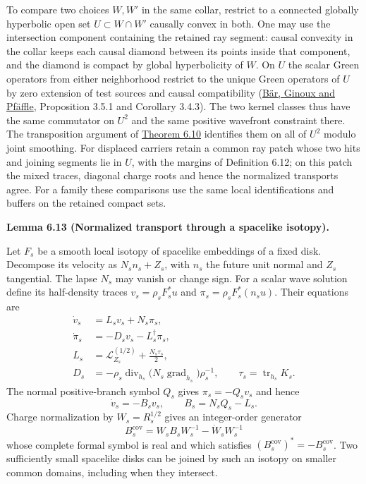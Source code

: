 \documentclass[
  english,
  11pt,
  reqno]{amsart}
\makeatletter
\newcommand{\pandocstatementheading}[1]{%
  \par\if@nobreak\else
    \addpenalty{\@beginparpenalty}%
    \addvspace{.5\baselineskip plus .2\baselineskip minus .2\baselineskip}%
  \fi
  {\normalfont\bfseries #1\par}%
  \nobreak\@afterindenttrue\@afterheading
}
\makeatother
\begin{document}
To compare two choices \(W,W'\) in the same collar, restrict to a
connected globally hyperbolic open set \(U\subset W\cap W'\) causally
convex in both. One may use the intersection component containing the
retained ray segment: causal convexity in the collar keeps each causal
diamond between its points inside that component, and the diamond is
compact by global hyperbolicity of \(W\). On \(U\) the scalar Green
operators from either neighborhood restrict to the unique Green
operators of \(U\) by zero extension of test sources and causal
compatibility (\hyperref[ref-BarGinouxPfaffle2007]{Bär, Ginoux and
Pfäffle}, Proposition 3.5.1 and Corollary 3.4.3). The two kernel classes
thus have the same commutator on \(U^2\) and the same positive wavefront
constraint there. The transposition argument of
\hyperref[thm:online-canonical-wave-kernel]{Theorem 6.10} identifies
them on all of \(U^2\) modulo joint smoothing. For displaced carriers
retain a common ray patch whose two hits and joining segments lie in
\(U\), with the margins of Definition 6.12; on this patch the mixed
traces, diagonal charge roots and hence the normalized transports agree.
For a family these comparisons use the same local identifications and
buffers on the retained compact sets.

\pandocstatementheading{\leavevmode{}\label{lem:online-wave-spacelike-transport}Lemma 6.13 (Normalized transport through a spacelike isotopy).}

Let \(F_s\) be a smooth local isotopy of spacelike embeddings of a fixed
disk. Decompose its velocity as \(N_sn_s+Z_s\), with \(n_s\) the future
unit normal and \(Z_s\) tangential. The lapse \(N_s\) may vanish or
change sign. For a scalar wave solution define its half-density traces
\(v_s=\rho_sF_s^*u\) and \(\pi_s=\rho_sF_s^*(n_su)\). Their equations
are%
 \[
\begin{aligned}
\dot v_s&=L_sv_s+N_s\pi_s,\\
\dot\pi_s&=-D_sv_s-L_s^\dagger\pi_s,\\
L_s&=\mathcal L_{Z_s}^{(1/2)}+\frac{N_s\tau_s}{2},\\
D_s&=-\rho_s\operatorname{div}_{h_s}
       \bigl(N_s\operatorname{grad}_{h_s}\bigr)\rho_s^{-1},
\qquad \tau_s=\operatorname{tr}_{h_s}K_s.
\end{aligned}
\] The normal positive-branch symbol \(Q_s\) gives \(\pi_s=-Q_sv_s\) and
hence%
 \[
\dot v_s=-B_sv_s,\qquad B_s=N_sQ_s-L_s.
\] Charge normalization by \(W_s=R_s^{1/2}\) gives an integer-order
generator%
 \[
B_s^{\mathrm{cov}}
=W_sB_sW_s^{-1}-\dot W_sW_s^{-1}
\] whose complete formal symbol is real and which satisfies
\((B_s^{\mathrm{cov}})^*=-B_s^{\mathrm{cov}}\). Two sufficiently small
spacelike disks can be joined by such an isotopy on smaller common
domains, including when they intersect.
\end{document}
